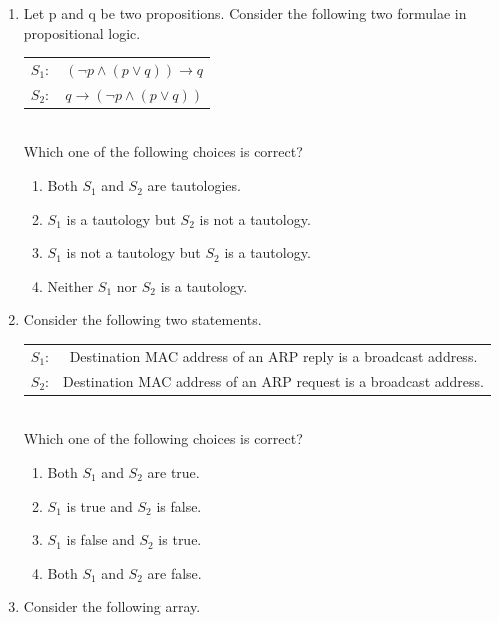 \documentclass[a4paper, 11pt]{article}
\begin{document}
\begin{enumerate}
    \item Let p and q be two propositions. Consider the following two formulae in propositional logic.\\
    \begin{tabular}{cc}
    \centering
    $S_1:$&$(\neg p \land (p \lor q)) \rightarrow q$\\
    $S_2:$&$ q \rightarrow (\neg p \land (p \lor q))$
    \end{tabular}\\
    Which one of the following choices is correct?
    \begin{enumerate}
        \item Both $S_1$ and $S_2$ are tautologies.
        \item $S_1$ is a tautology but $S_2$ is not a tautology.
        \item $S_1$ is not a tautology but $S_2$ is a tautology.
        \item Neither $S_1$ nor $S_2$ is a tautology.
    \end{enumerate}
    \hfill{}
    
    \item Consider the following two statements.\\
    \begin{tabular}{cc}
        $S_1$: & Destination MAC address of an ARP reply is a broadcast address. \\
        $S_2$: & Destination MAC address of an ARP request is a broadcast address.
    \end{tabular}\\
    Which one of the following choices is correct?
    \begin{enumerate}
        \item Both $S_1$ and $S_2$ are true.
        \item $S_1$ is true and $S_2$ is false.
        \item $S_1$ is false and $S_2$ is true.
        \item Both $S_1$ and $S_2$ are false.
    \end{enumerate}
    \hfill{}
    
    \item Consider the following array.
    

\end{enumerate}
\end{document}
